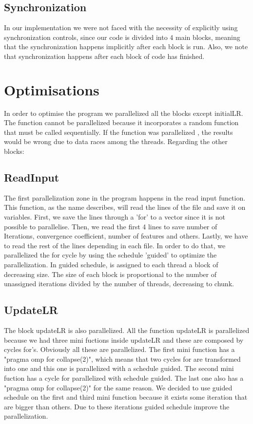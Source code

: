 \documentclass[twocolumn]{article}
\begin{document}
    \subsection{Synchronization}
    \label{subsec:synchronization}
    In our implementation we were not faced with the necessity of explicitly using synchronization controls, since our code is divided into 4 main blocks, meaning that the synchronization happens implicitly after each block is run.
    Also, we note that synchronization happens after each block of code has finished.


    \section{Optimisations} \label{sec:optimisations}

    In order to optimise the program we parallelized all the blocks except initialLR. The function cannot be parallelized because it incorporates a random function that must be called sequentially.
    If the function was parallelized , the results would be wrong due to data races among the threads.
    Regarding the other blocks:

    \subsection{ReadInput}\label{subsec:readinput2}
    The first parallelization zone in the program happens in the read input function.
    This function, as the name describes, will read the lines of the file and save it on variables.
    First, we save the lines through a 'for' to a vector since it is not possible to parallelise.
    Then, we read the first 4 lines to save number of Iterations, convergence coefficient, number of features and others.
    Lastly, we have to read the rest of the lines depending in each file.
    In order to do that, we parallelized the for cycle by using the schedule 'guided' to optimize the parallelization.
    In guided schedule, is assigned to each thread a block of decreasing size.
    The size of each block is proportional to the number of unassigned iterations divided by the number of threads, decreasing to chunk.

    \subsection{UpdateLR}\label{subsec:updatelr2}
    The block updateLR is also parallelized.
    All the function updateLR is parallelized because we had three mini fuctions inside updateLR and these are composed by cycles for's.
    Obviously all these are parallelized.
    The first mini function has a "pragma omp for collapse(2)", which means that two cycles for are transformed into one and this one is parallelized with a schedule guided.
    The second mini fuction has a cycle for parallelized with schedule guided.
    The last one also has a "pragma omp for collapse(2)" for the same reason.
    We decided to use guided schedule on the first and third mini function because it exists some iteration that are bigger than others.
    Due to these iterations guided schedule improve the parallelization.
\end{document}
